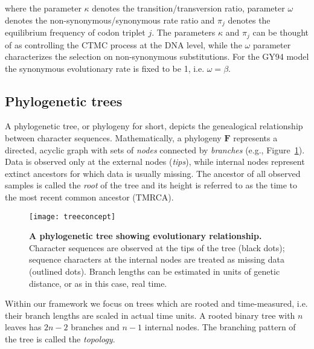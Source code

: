 \noindent
where the parameter $\kappa$ denotes the transition/transversion ratio, parameter $\omega$ denotes the non-synonymous/synonymous
rate ratio and $\pi_j$ denotes the equilibrium frequency of codon triplet $j$.
The parameters $\kappa$ and $\pi_j$ can be thought of as controlling the CTMC process at the DNA level, while the $\omega$ parameter characterizes the selection on non-synonymous substitutions.
For the GY94 model the synonymous evolutionary rate is fixed to be 1, i.e. $\omega=\beta$.

\subsection{Phylogenetic trees}


A phylogenetic tree, or phylogeny for short, depicts the genealogical relationship between character sequences.
Mathematically, a phylogeny $\mathbf{F}$ represents a directed, acyclic graph with sets of \emph{nodes} connected by \emph{branches} (e.g., Figure~\ref{fig:treeconcept}).
Data is observed only at the external nodes (\emph{tips}), while internal nodes represent extinct ancestors for which data is usually missing.
The ancestor of all observed samples is called the \emph{root} of the tree and its height is referred to as the time to the most recent common ancestor (TMRCA).

\begin{figure}[H]
\centering
\texttt{[image: treeconcept]} 
\caption{
{ \footnotesize 
{\bf A phylogenetic tree showing evolutionary relationship.} Character sequences are observed at the tips of the tree (black dots); sequence characters at the internal nodes are treated as missing data (outlined dots). 
Branch lengths can be estimated in units of genetic distance, or as in this case, real time.
} %
}
\label{fig:treeconcept}
\end{figure}

Within our framework we focus on trees which are rooted and time-measured, i.e. their branch lengths are scaled in actual time units.
A rooted binary tree with $n$ leaves has $2n-2$ branches and $n-1$ internal nodes.
The branching pattern of the tree is called the \emph{topology}. 

